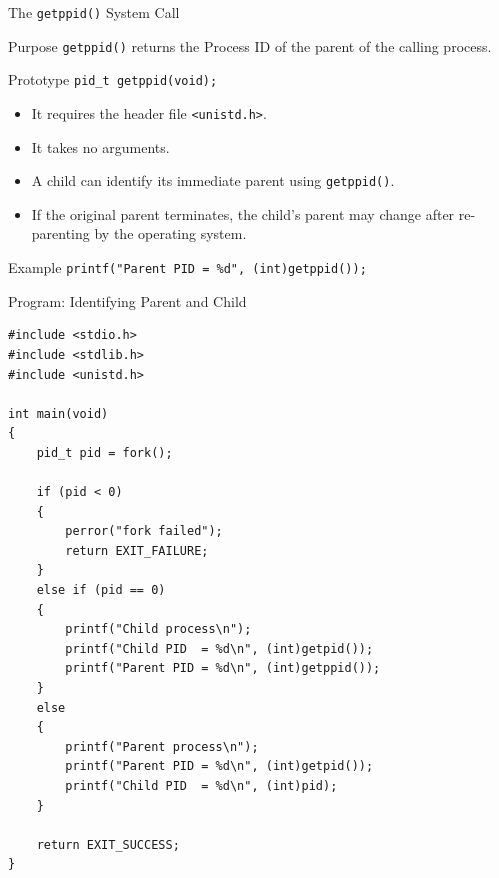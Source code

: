 \documentclass[aspectratio=169]{beamer}
\begin{document}
\begin{frame}{The \texttt{getppid()} System Call}

\begin{block}{Purpose}
\texttt{getppid()} returns the Process ID of the parent of the calling process.
\end{block}

\begin{block}{Prototype}
\centering
\texttt{pid\_t getppid(void);}
\end{block}

\begin{itemize}
    \item It requires the header file \texttt{<unistd.h>}.
    \item It takes no arguments.
    \item A child can identify its immediate parent using \texttt{getppid()}.
    \item If the original parent terminates, the child's parent may change after
    re-parenting by the operating system.
\end{itemize}

\begin{exampleblock}{Example}
\centering
\texttt{printf("Parent PID = \%d", (int)getppid());}
\end{exampleblock}

\end{frame}

\begin{frame}[fragile]{Program: Identifying Parent and Child}

\begin{lstlisting}[style=cstyle]
#include <stdio.h>
#include <stdlib.h>
#include <unistd.h>

int main(void)
{
    pid_t pid = fork();

    if (pid < 0)
    {
        perror("fork failed");
        return EXIT_FAILURE;
    }
    else if (pid == 0)
    {
        printf("Child process\n");
        printf("Child PID  = %d\n", (int)getpid());
        printf("Parent PID = %d\n", (int)getppid());
    }
    else
    {
        printf("Parent process\n");
        printf("Parent PID = %d\n", (int)getpid());
        printf("Child PID  = %d\n", (int)pid);
    }

    return EXIT_SUCCESS;
}
\end{lstlisting}

\end{frame}
\end{document}
